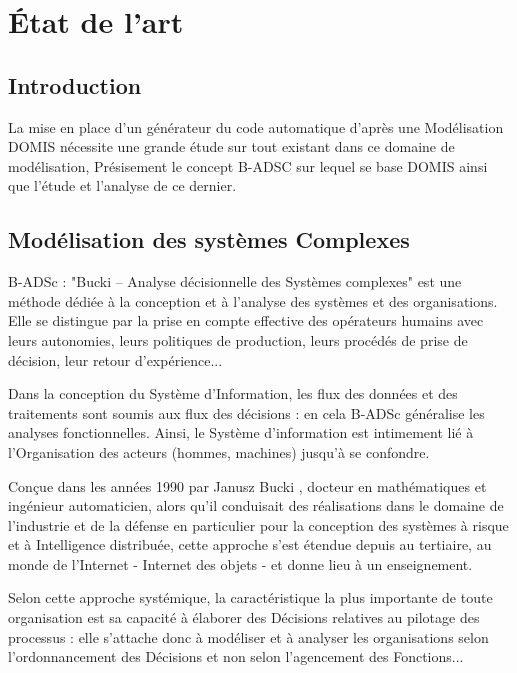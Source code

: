 
\vspace{1cm}
\section{État de l'art}

\subsection{Introduction}

La mise en place d'un générateur du code automatique d’après une Modélisation DOMIS nécessite une grande étude sur tout existant dans ce domaine de modélisation, Présisement le concept B-ADSC sur lequel se base DOMIS ainsi que l'étude et l'analyse de ce dernier.


\subsection{Modélisation des systèmes Complexes}

B-ADSc : "Bucki – Analyse décisionnelle des Systèmes complexes" est une méthode dédiée à la conception et à l’analyse des systèmes et des organisations. Elle se distingue par la prise en compte effective des opérateurs humains avec leurs autonomies, leurs politiques de production, leurs procédés de prise de décision, leur retour d’expérience...

Dans la conception du Système d'Information, les flux des données et des traitements sont soumis aux flux des décisions : en cela B-ADSc généralise les analyses fonctionnelles. Ainsi, le Système d’information est intimement lié à l’Organisation des acteurs (hommes, machines) jusqu'à se confondre.

Conçue dans les années 1990 par Janusz Bucki \cite{B-ADSC}, docteur en mathématiques et ingénieur automaticien, alors qu’il conduisait des réalisations dans le domaine de l’industrie et de la défense en particulier pour la conception des systèmes à risque et à Intelligence distribuée, cette approche s’est étendue depuis au tertiaire, au monde de l'Internet - Internet des objets - et donne lieu à un enseignement.

Selon cette approche systémique, la caractéristique la plus importante de toute organisation est sa capacité à élaborer des Décisions relatives au pilotage des processus : elle s'attache donc à modéliser et à analyser les organisations selon l'ordonnancement des Décisions et non selon l'agencement des Fonctions...

